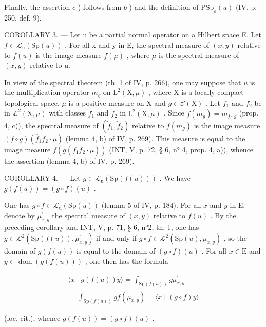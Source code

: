 Finally, the assertion \(c\) ) follows from \(b\) ) and the definition of \(\mathrm{PSp}_{\varepsilon}(u)\) (IV, p. 250, def. 9).

COROLLARY 3. --- Let u be a partial normal operator on a Hilbert space E. Let \(f \in \mathcal{L}_{\mathrm{u}}(\mathrm{Sp}(u))\) . For all x and y in E, the spectral measure of \((x, y)\) relative to \(f(u)\) is the image measure \(f(\mu)\) , where \(\mu\) is the spectral measure of \((x, y)\) relative to u.

In view of the spectral theorem (th. 1 of IV, p. 266), one may suppose that \(u\) is the multiplication operator \(m_g\) on \(\mathrm{L}^2 (\mathrm{X},\mu)\) , where X is a locally compact topological space, \(\mu\) is a positive measure on X and \(g\in \mathcal{C}(\mathrm{X})\) . Let \(f_{1}\) and \(f_{2}\) be in \(\mathcal{L}^2 (\mathrm{X},\mu)\) with classes \(\widetilde{f}_1\) and \(\widetilde{f}_2\) in \(\mathrm{L}^2 (\mathrm{X},\mu)\) . Since \(f(m_g) = m_{f\circ g}\) (prop. 4, c)), the spectral measure of \((\widetilde{f}_1,\widetilde{f}_2)\) relative to \(f(m_g)\) is the image measure \((f\circ g)(\overline{f}_1f_2\cdot \mu)\) (lemma 4, b) of IV, p. 269). This measure is equal to the image measure \(f(g(\overline{f}_1f_2\cdot \mu))\) (INT, V, p. 72, § 6, n° 4, prop. 4, a)), whence the assertion (lemma 4, b) of IV, p. 269).

COROLLARY 4. --- Let \(g \in \mathcal{L}_{\mathrm{u}}(\mathrm{Sp}(f(u)))\) . We have \(g(f(u)) = (g \circ f)(u)\) .

One has \(g \circ f \in \mathcal{L}_{\mathrm{u}}(\mathrm{Sp}(u))\) (lemma 5 of IV, p. 184). For all \(x\) and \(y\) in E, denote by \(\mu_{x,y}^{\prime}\) the spectral measure of \((x,y)\) relative to \(f(u)\) . By the preceding corollary and INT, V, p. 71, § 6, n°2, th. 1, one has \(g \in \mathcal{L}^{2}(\mathrm{Sp}(f(u)), \mu_{x,y}^{\prime})\) if and only if \(g \circ f \in \mathcal{L}^{2}(\mathrm{Sp}(u), \mu_{x,y})\) , so the domain of \(g(f(u))\) is equal to the domain of \((g \circ f)(u)\) . For all \(x \in \mathrm{E}\) and \(y \in \operatorname{dom}(g(f(u)))\) , one then has the formula

\[
\begin{array}{c} \langle x \mid g (f (u)) y \rangle = \int_ {\mathrm{Sp} (f (u))} g \mu_ {x, y} ^ {\prime} \\ = \int_ {\mathrm{Sp} (f (u))} g f (\mu_ {x, y}) = \langle x \mid (g \circ f) y \rangle \end{array}
\]

(loc. cit.), whence \(g(f(u)) = (g \circ f)(u)\) .

